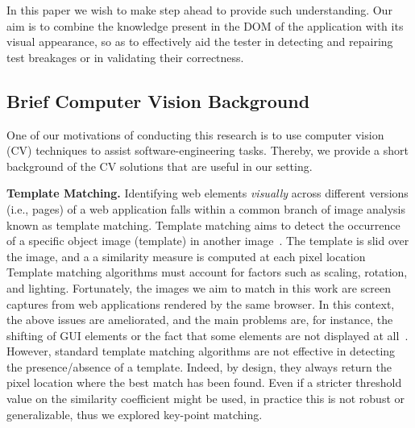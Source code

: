 In this paper we wish to make step ahead to provide such understanding. 
Our aim is to combine the knowledge present in the DOM of the application with its visual appearance, so as to effectively aid the tester in detecting and repairing test breakages or in validating their correctness. %


\subsection{Brief Computer Vision Background}\label{sec:cv}

One of our motivations of conducting this research is to use computer vision (CV) techniques to assist software-engineering tasks. 
Thereby, we provide a short background of the CV solutions that are useful in our setting.

\noindent
\textbf{Template Matching.}\label{sec:tm}
Identifying web elements \textit{visually} across different versions (i.e., pages) of a web application falls within a common branch of image analysis known as template matching. 
%
Template matching aims to detect the occurrence of a specific  object image (template) in another image~\cite{Brunelli:2009:TMT:1643435}. The template is slid over the image, and a a similarity measure is computed at each pixel location
%
Template matching algorithms must account for factors such as scaling, rotation, and lighting. Fortunately, the images we aim to match in this work are screen captures from web applications rendered by the same browser. In this context, the above issues are ameliorated, and the main problems are, for instance, the shifting of GUI elements or the fact that some elements are not displayed at all~\cite{}.
% 
However, standard template matching algorithms are not effective in detecting the presence/absence of a template. Indeed, by design, they always return the pixel location where the best match has been found. Even if a stricter threshold value on the similarity coefficient might be used, in practice this is not robust or generalizable, thus we explored key-point matching.

